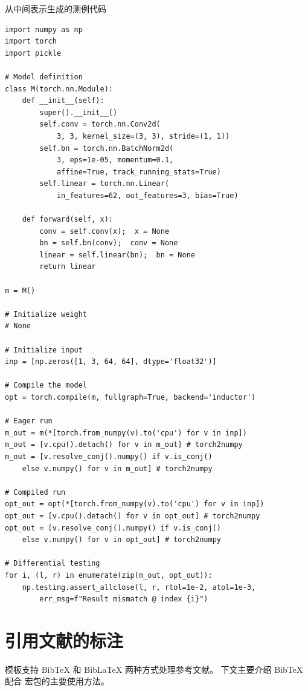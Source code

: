 \begin{listing}[]
    \caption{从中间表示生成的测例代码}
    \label{listing:gencode}
\begin{verbatim}
import numpy as np
import torch
import pickle

# Model definition
class M(torch.nn.Module):
    def __init__(self):
        super().__init__()
        self.conv = torch.nn.Conv2d(
            3, 3, kernel_size=(3, 3), stride=(1, 1))
        self.bn = torch.nn.BatchNorm2d(
            3, eps=1e-05, momentum=0.1,
            affine=True, track_running_stats=True)
        self.linear = torch.nn.Linear(
            in_features=62, out_features=3, bias=True)

    def forward(self, x):
        conv = self.conv(x);  x = None
        bn = self.bn(conv);  conv = None
        linear = self.linear(bn);  bn = None
        return linear

m = M()

# Initialize weight
# None

# Initialize input
inp = [np.zeros([1, 3, 64, 64], dtype='float32')]

# Compile the model
opt = torch.compile(m, fullgraph=True, backend='inductor')

# Eager run
m_out = m(*[torch.from_numpy(v).to('cpu') for v in inp])
m_out = [v.cpu().detach() for v in m_out] # torch2numpy
m_out = [v.resolve_conj().numpy() if v.is_conj()
    else v.numpy() for v in m_out] # torch2numpy

# Compiled run
opt_out = opt(*[torch.from_numpy(v).to('cpu') for v in inp])
opt_out = [v.cpu().detach() for v in opt_out] # torch2numpy
opt_out = [v.resolve_conj().numpy() if v.is_conj()
    else v.numpy() for v in opt_out] # torch2numpy

# Differential testing
for i, (l, r) in enumerate(zip(m_out, opt_out)):
    np.testing.assert_allclose(l, r, rtol=1e-2, atol=1e-3,
        err_msg=f"Result mismatch @ index {i}")
\end{verbatim}
\end{listing}

\iffalse
\chapter{引用文献的标注}

模板支持 BibTeX 和 BibLaTeX 两种方式处理参考文献。
下文主要介绍 BibTeX 配合  宏包的主要使用方法。


